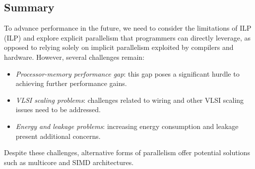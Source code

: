 \subsection{Summary}
To advance performance in the future, we need to consider the limitations of ILP (ILP) and explore explicit parallelism that programmers can directly leverage, as opposed to relying solely on implicit parallelism exploited by compilers and hardware.
However, several challenges remain:
\begin{itemize}
    \item \textit{Processor-memory performance gap}: this gap poses a significant hurdle to achieving further performance gains.
    \item \textit{VLSI scaling problems}: challenges related to wiring and other VLSI scaling issues need to be addressed.
    \item \textit{Energy and leakage problems}: increasing energy consumption and leakage present additional concerns.
\end{itemize}
Despite these challenges, alternative forms of parallelism offer potential solutions such as multicore and SIMD architectures.
